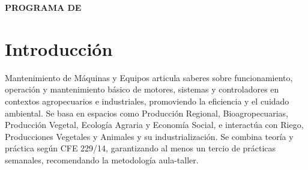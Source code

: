 


\begin{center}
\textbf{PROGRAMA DE \materiaLong}
\end{center}

\section*{Introducción}
Mantenimiento de Máquinas y Equipos articula saberes sobre funcionamiento, operación y mantenimiento básico de motores, sistemas y controladores en contextos agropecuarios e industriales, promoviendo la eficiencia y el cuidado ambiental. Se basa en espacios como Producción Regional, Bioagropecuarias, Producción Vegetal, Ecología Agraria y Economía Social, e interactúa con Riego, Producciones Vegetales y Animales y su industrialización. Se combina teoría y práctica según CFE 229/14, garantizando al menos un tercio de prácticas semanales, recomendando la metodología aula-taller.

